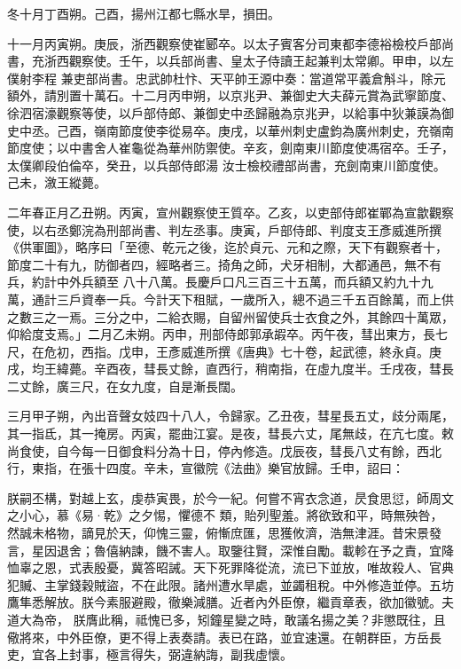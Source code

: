 \begin{pinyinscope}
 冬十月丁酉朔。己酉，揚州江都七縣水旱，損田。



 十一月丙寅朔。庚辰，浙西觀察使崔郾卒。以太子賓客分司東都李德裕檢校戶部尚書，充浙西觀察使。壬午，以兵部尚書、皇太子侍讀王起兼判太常卿。甲申，以左僕射李程
 兼吏部尚書。忠武帥杜忭、天平帥王源中奏：當道常平義倉斛斗，除元額外，請別置十萬石。十二月丙申朔，以京兆尹、兼御史大夫薛元賞為武寧節度、徐泗宿濠觀察等使，以戶部侍郎、兼御史中丞歸融為京兆尹，以給事中狄兼謨為御史中丞。己酉，嶺南節度使李從易卒。庚戌，以華州刺史盧鈞為廣州刺史，充嶺南節度使；以中書舍人崔龜從為華州防禦使。辛亥，劍南東川節度使馮宿卒。壬子，太僕卿段伯倫卒，癸丑，以兵部侍郎湯
 汝士檢校禮部尚書，充劍南東川節度使。己未，漵王縱薨。



 二年春正月乙丑朔。丙寅，宣州觀察使王質卒。乙亥，以吏部侍郎崔鄲為宣歙觀察使，以右丞鄭浣為刑部尚書、判左丞事。庚寅，戶部侍郎、判度支王彥威進所撰《供軍圖》，略序曰「至德、乾元之後，迄於貞元、元和之際，天下有觀察者十，節度二十有九，防御者四，經略者三。掎角之師，犬牙相制，大都通邑，無不有兵，約計中外兵額至
 八十八萬。長慶戶口凡三百三十五萬，而兵額又約九十九萬，通計三戶資奉一兵。今計天下租賦，一歲所入，總不過三千五百餘萬，而上供之數三之一焉。三分之中，二給衣賜，自留州留使兵士衣食之外，其餘四十萬眾，仰給度支焉。」二月乙未朔。丙申，刑部侍郎郭承嘏卒。丙午夜，彗出東方，長七尺，在危初，西指。戊申，王彥威進所撰《唐典》七十卷，起武德，終永貞。庚戌，均王緯薨。辛酉夜，彗長丈餘，直西行，稍南指，在虛九度半。壬戌夜，彗長
 二丈餘，廣三尺，在女九度，自是漸長闊。



 三月甲子朔，內出音聲女妓四十八人，令歸家。乙丑夜，彗星長五丈，歧分兩尾，其一指氐，其一掩房。丙寅，罷曲江宴。是夜，彗長六丈，尾無歧，在亢七度。敕尚食使，自今每一日御食料分為十日，停內修造。戊辰夜，彗長八丈有餘，西北行，東指，在張十四度。辛未，宣徽院《法曲》樂官放歸。壬申，詔曰：



 朕嗣丕構，對越上玄，虔恭寅畏，於今一紀。何嘗不宵衣念道，昃食思愆，師周文之小心，慕《易·乾》之夕惕，懼德不
 類，貽列聖羞。將欲致和平，時無殃咎，然誠未格物，謫見於天，仰愧三靈，俯慚庶匯，思獲攸濟，浩無津涯。昔宋景發言，星因退舍；魯僖納諫，饑不害人。取鑒往賢，深惟自勵。載軫在予之責，宜降恤辜之恩，式表殷憂，冀答昭誡。天下死罪降從流，流已下並放，唯故殺人、官典犯贓、主掌錢穀賊盜，不在此限。諸州遭水旱處，並蠲租稅。中外修造並停。五坊鷹隼悉解放。朕今素服避殿，徹樂減膳。近者內外臣僚，繼貢章表，欲加徽號。夫道大為帝，
 朕膺此稱，祗愧已多，矧鐘星變之時，敢議名揚之美？非懲既往，且儆將來，中外臣僚，更不得上表奏請。表已在路，並宜速還。在朝群臣，方岳長吏，宜各上封事，極言得失，弼違納誨，副我虛懷。




\end{pinyinscope}
